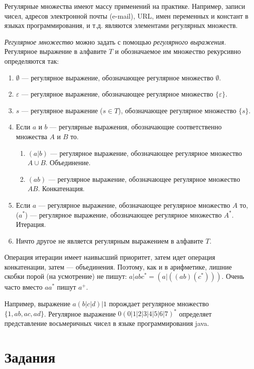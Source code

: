 Регулярные множества имеют массу применений на практике. Например, записи чисел, адресов электронной почты (e-mail), URL, имен переменных и констант в языках программирования, и т.д. являются элементами регулярных множеств.

\emph{Регулярное множество} можно задать с помощью \emph{регулярного выражения}. Регулярное выражение в алфавите $T$ и обозначаемое им множество рекурсивно определяются так:

\begin{enumerate}
	\item $\emptyset$ --- регулярное выражение, обозначающее регулярное множество $\emptyset$.
	\item $\varepsilon$ --- регулярное выражение, обозначающее регулярное множество $\{\varepsilon\}$.
	\item $s$ --- регулярное выражение ($s\in T$), обозначающее регулярное множество $\{s\}$.
	\item Если $a$ и $b$ --- регулярные выражения, обозначающие соответственно множества $A$ и $B$ то.
    \begin{enumerate}
        \item $(a|b)$ --- регулярное выражение, обозначающее регулярное множество $A\cup B$. Объединение.
        \item $(ab)$ --- регулярное выражение, обозначающее регулярное множество $AB$. Конкатенация.
    \end{enumerate}

	\item Если $a$ --- регулярное выражение, обозначающее регулярное множество $A$ то, ($a^*$) --- регулярное выражение, обозначающее регулярное множество $A^*$. Итерация.
    \item Ничто другое не является регулярным выражением в алфавите $T$.
\end{enumerate}

Операция итерации имеет наивысший приоритет, затем идет операция конкатенации, затем --- объединения. Поэтому, как и в арифметике, лишние скобки порой (на усмотрение) не пишут: $a|abc^*=(a|((ab)(c^*)))$. Очень часто вместо $aa^*$ пишут $a^+$.

Например, выражение $a(b|c|d)|1$ порождает регулярное множество $\{1,ab,ac,ad\}$. Регулярное выражение $0(0|1|2|3|4|5|6|7)^*$ определяет представление восьмеричных чисел в языке программирования java.


\section*{Задания}

